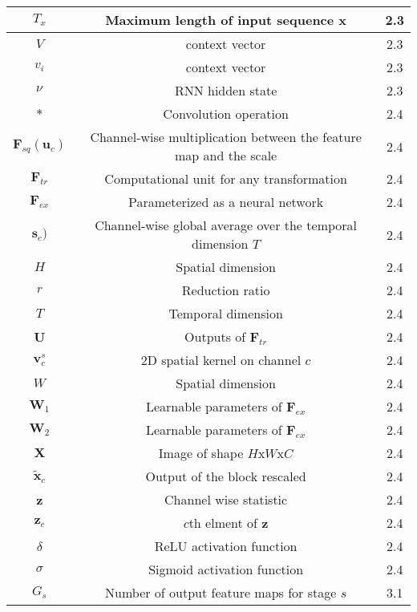 \documentclass[preprint,12pt,3p]{elsarticle}
\begin{document}
\begin{table*}[htpb]
\begin{adjustbox}{width=0.71 \linewidth}
\begin{tabularx}{1.55 \textwidth}{|c|C|c|}
    \hline
    $T_x$ & Maximum length of input sequence x & 2.3 \\
    \hline
    $V$   & context vector & 2.3 \\
    \hline
    $v_i$ & context vector & 2.3 \\
    \hline
    $\nu_{}$ & RNN hidden state & 2.3 \\
    \hline
    $*$     & Convolution operation & 2.4 \\
    \hline
    $\mathbf F_{sq}(\mathbf u_c)$ & Channel-wise multiplication between the feature map and the scale & 2.4 \\
    \hline
    $\textbf{F}_{tr}$ & Computational unit for any transformation & 2.4 \\
    \hline
    $\mathbf F_{ex}$ & Parameterized as a neural network & 2.4 \\
    \hline
    $\textbf{s}_c)$ & Channel-wise global average over the temporal dimension $T$ & 2.4 \\
    \hline
    $H$   & Spatial dimension & 2.4 \\
    \hline
    $r$   & Reduction ratio & 2.4 \\
    \hline
    $T$   & Temporal dimension & 2.4 \\
    \hline
    \textbf{U}   & Outputs of $\textbf{F}_{tr}$ & 2.4 \\
    \hline
    $\mathbf v_c^s$ & 2D spatial kernel on channel $c$ & 2.4 \\
    \hline
    $W$   & Spatial dimension & 2.4 \\
    \hline
    $\textbf{W}_1$ & Learnable parameters of $\mathbf F_{ex}$ & 2.4 \\
    \hline
    $\textbf{W}_2$ & Learnable parameters of $\mathbf F_{ex}$ & 2.4 \\
    \hline
    $\textbf{X}$   & Image of shape $H$x$W$x$C$ & 2.4 \\
    \hline
    $\widetilde{\textbf{x}}_c$ & Output of the block rescaled & 2.4 \\
    \hline
    \textbf{z}   & Channel wise statistic & 2.4 \\
    \hline
    $\textbf{z}_c$ & $c$th elment of \textbf{z} & 2.4 \\
    \hline
    $\delta$ & ReLU activation function & 2.4 \\
    \hline
    $\sigma$     & Sigmoid activation function & 2.4 \\
    \hline
    $G_s$ & Number of output feature maps for stage $s$ & 3.1 \\

\end{tabularx}
\end{adjustbox}
\end{table*}
\end{document}
